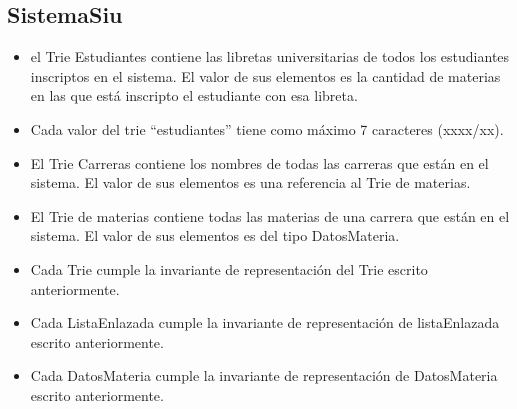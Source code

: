 \documentclass[10pt,a4paper]{article}
\begin{document}
\subsection{SistemaSiu}

\begin{itemize}
	\item el Trie Estudiantes contiene las libretas universitarias de todos los estudiantes
	      inscriptos en el sistema. El valor de sus elementos es la cantidad de materias en las que
	      está inscripto el estudiante con esa libreta.
	\item Cada valor del trie “estudiantes” tiene como máximo 7 caracteres (xxxx/xx).
	\item El Trie Carreras contiene los nombres de todas las carreras que están en el sistema.
	      El valor de sus elementos es una referencia al Trie de materias.
	\item El Trie de materias contiene todas las materias de una carrera que están en el sistema.
	      El valor de sus elementos es del tipo DatosMateria.
	\item Cada Trie cumple la invariante de representación del Trie escrito anteriormente.
	\item Cada ListaEnlazada cumple la invariante de representación de listaEnlazada escrito anteriormente.
	\item Cada DatosMateria cumple la invariante de representación de DatosMateria escrito anteriormente.
\end{itemize}
\end{document}
